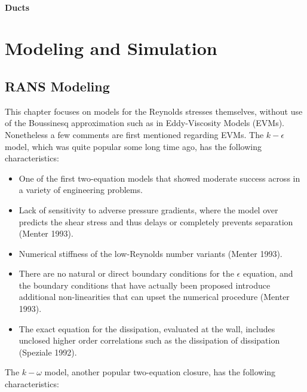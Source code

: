 \documentclass[oneside,a4paper,11pt]{report}
\begin{document}
\subsection{Ducts}

\part{Modeling and Simulation}

\chapter{RANS Modeling}
This chapter focuses on models for the Reynolds stresses themselves, without use of the Boussinesq approximation such as in Eddy-Viscosity Models (EVMs). Nonetheless a few comments are first mentioned regarding EVMs. The $k-\epsilon$ model, which was quite popular some long time ago, has the following characteristics:
\begin{itemize}
\item One of the first two-equation models that showed moderate success across in a variety of engineering problems.
\item Lack of sensitivity to adverse pressure gradients, where the model over predicts the shear stress and thus delays or completely prevents separation (Menter 1993).
\item Numerical stiffness of the low-Reynolds number variants (Menter 1993).
\item There are no natural or direct boundary conditions for the $\epsilon$ equation, and the boundary conditions that have actually been proposed introduce additional non-linearities that can upset the numerical procedure (Menter 1993). 
\item The exact equation for the dissipation, evaluated at the wall, includes unclosed higher order correlations such as the dissipation of dissipation (Speziale 1992).  
\end{itemize}
The $k-\omega$ model, another popular two-equation closure, has the following characteristics:
\end{document}
